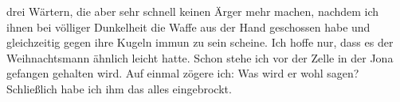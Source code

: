 drei Wärtern, die aber sehr schnell keinen Ärger mehr machen, nachdem ich ihnen bei völliger Dunkelheit die Waffe aus der Hand geschossen habe und gleichzeitig gegen ihre Kugeln immun zu sein scheine. Ich hoffe nur, dass es der Weihnachtsmann ähnlich leicht hatte. Schon stehe ich vor der Zelle in der Jona gefangen gehalten wird. Auf einmal zögere ich: Was wird er wohl sagen? Schließlich habe ich ihm das alles eingebrockt.
